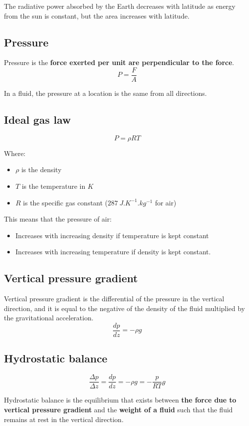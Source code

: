 \documentclass[11pt]{article}
\begin{document}
 \noindent The radiative power absorbed by the Earth decreases with latitude as energy from the sun is constant, but the area increases with latitude.

\subsection{Pressure}
\label{sec:org79c9efb}
Pressure is the \textbf{force exerted per unit are perpendicular to the force}.
\[P = \frac{F}{A}\]

In a fluid, the pressure at a location is the same from all directions.

\subsection{Ideal gas law}
\label{sec:orgc939afa}
\[P = \rho RT\]

Where:
\begin{itemize}
\item \(\rho\) is the density
\item \(T\) is the temperature in \(\unit{K}\)
\item \(R\) is the specific gas constant (\(\qty{287}{J.K^{-1}.kg^{-1}}\) for air)
\end{itemize}

This means that the pressure of air:
\begin{itemize}
\item Increases with increasing density if temperature is kept constant
\item Increases with increasing temperature if density is kept constant.
\end{itemize}

\subsection{Vertical pressure gradient}
\label{sec:org1b8f3aa}
Vertical pressure gradient is the differential of the pressure in the vertical direction, and it is equal to the negative of the density of the fluid multiplied by the gravitational acceleration.
\[\frac{dp}{dz} = - \rho g\]

\subsection{Hydrostatic balance}
\label{sec:org6f66e7e}
\[\frac{\Delta p}{\Delta z} = \frac{dp}{dz} = -\rho g = - \frac{p}{RT}g\]

Hydrostatic balance is the equilibrium that exists between \textbf{the force due to vertical pressure gradient} and the \textbf{weight of a fluid} such that the fluid remains at rest in the vertical direction.
\\[0pt]
\end{document}
